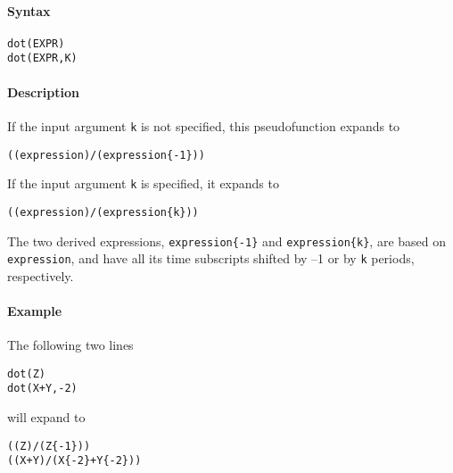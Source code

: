 


	\paragraph{Syntax}

\begin{verbatim}
dot(EXPR)
dot(EXPR,K)
\end{verbatim}

\paragraph{Description}

If the input argument \texttt{k} is not specified, this pseudofunction
expands to

\begin{verbatim}
((expression)/(expression{-1}))
\end{verbatim}

If the input argument \texttt{k} is specified, it expands to

\begin{verbatim}
((expression)/(expression{k}))
\end{verbatim}

The two derived expressions, \texttt{expression\{-1\}} and
\texttt{expression\{k\}}, are based on \texttt{expression}, and have all
its time subscripts shifted by --1 or by \texttt{k} periods,
respectively.

\paragraph{Example}

The following two lines

\begin{verbatim}
dot(Z)
dot(X+Y,-2)
\end{verbatim}

will expand to

\begin{verbatim}
((Z)/(Z{-1}))
((X+Y)/(X{-2}+Y{-2}))
\end{verbatim}


